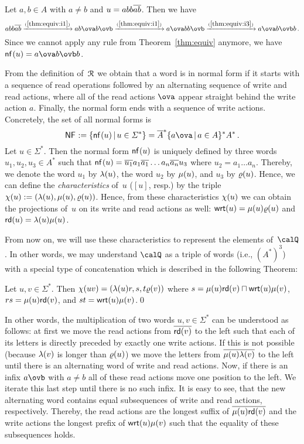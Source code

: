 \begin{example}\label{ex:nfx}
	Let $a,b\in A$ with $a\neq b$ and $u=abb\overline{ab}$. Then we have
	\[
	abb\ov{ab}\xrightarrow{(\ref{thm:equiv:i1})} ab\ova b\ovb\xrightarrow{(\ref{thm:equiv:i1})} a\ova bb\ovb\xrightarrow{(\ref{thm:equiv:i3})} a\ova b\ovb b\,.
	\]
	Since we cannot apply any rule from Theorem~\ref{thm:equiv} anymore, we have $\nfx{u}=a\ova b\ovb b$.
\end{example}

From the definition of~$\mathcal{R}_{}$ we obtain that a word is in normal form if it starts with a sequence of read operations followed by an alternating sequence of write and read actions, where all of the read actions $\ova$ appear straight behind the write action $a$. Finally, the normal form ends with a sequence of write actions. Concretely, the set of all normal forms is
\[\NFx:=\{\nfx{u}\,|\,u\in\varSigma^*\}=\ov{A}^*\{a\ova\,|\,a\in A\}^*A^*\,.\]
Let $u\in\varSigma^*$. Then the normal form $\mathsf{nf}_{}(u)$ is uniquely defined by three words $u_1,u_2,u_3\in A^*$ such that $\mathsf{nf}_{}(u)=\overline{u_1}a_1\overline{a_1}\dots a_n\overline{a_n}u_3$ where $u_2=a_1\dots a_n$. Thereby, we denote the word $u_1$ by $\lambda(u)$, the word $u_2$ by $\mu(u)$, and $u_3$ by $\varrho(u)$. Hence, we can define the \emph{characteristics} of~$u$ ($[u]$, resp.) by the triple 
$\chi(u):=(\lambda(u),\mu(u),\varrho(u))$.
Hence, from these characteristics $\chi(u)$ we can obtain the projections of~$u$ on its write and read actions as well: $\mathsf{wrt}(u)=\mu(u)\varrho(u)$ and $\mathsf{rd}(u)=\lambda(u)\mu(u)$.

From now on, we will use these characteristics to represent the elements of~$\Qx$. In other words, we may understand $\Qx$ as a triple of words (i.e., $(A^*)^3$) with a special type of concatenation which is described in the following Theorem:

\begin{theorem}\label{thm:concat}
	Let $u,v\in\varSigma^*$. Then
	$\chi(uv)=(\lambda(u)r,s,t\varrho(v))$
	where $s=\mu(u)\mathsf{rd}(v)\sqcap\mathsf{wrt}(u)\mu(v)$, $rs=\mu(u)\mathsf{rd}(v)$, and $st=\mathsf{wrt}(u)\mu(v)$.\qed
\end{theorem}

In other words, the multiplication of two words $u,v\in\varSigma^*$ can be understood as follows: at first we move the read actions from $\overline{\mathsf{rd}(v)}$ to the left such that each of its letters is directly preceded by exactly one write actions. If this is not possible (because $\lambda(v)$ is longer than $\varrho(u)$) we move the letters from $\overline{\mu(u)\lambda(v)}$ to the left until there is an alternating word of write and read actions. Now, if there is an infix $a\ovb$ with $a\neq b$ all of these read actions move one position to the left. We iterate this last step until there is no such infix. It is easy to see, that the new alternating word contains equal subsequences of write and read actions, respectively. Thereby, the read actions are the longest suffix of $\overline{\mu(u)\mathsf{rd}(v)}$ and the write actions the longest prefix of $\mathsf{wrt}(u)\mu(v)$ such that the equality of these subsequences holds.

